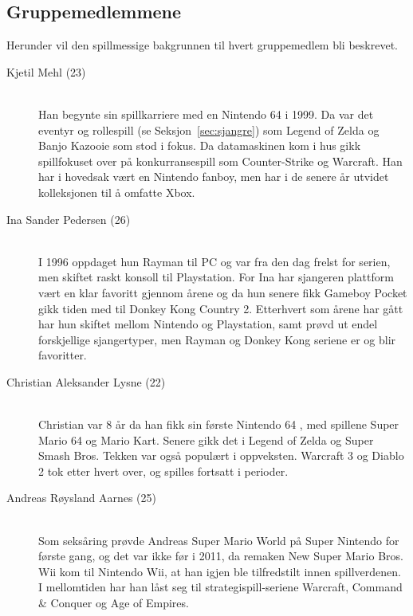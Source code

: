 \subsection{Gruppemedlemmene}
Herunder vil den spillmessige bakgrunnen til hvert gruppemedlem bli
beskrevet.
\begin{description}
\item[Kjetil Mehl (23)] \hfill \\
Han begynte sin spillkarriere med en Nintendo 64\cite{n64} i 1999. Da
var det eventyr og rollespill (se Seksjon~\ref{sec:sjangre}) som Legend
of Zelda\cite{legendofzelda} og Banjo Kazooie\cite{banjokazooie} som
stod i fokus. Da datamaskinen kom i hus gikk spillfokuset  over på
konkurransespill som Counter-Strike og Warcraft. Han har i hovedsak vært
en Nintendo fanboy\cite{fanboy}, men har i de senere år utvidet
kolleksjonen til å omfatte Xbox.
\item[Ina Sander Pedersen (26)] \hfill \\
I 1996 oppdaget hun Rayman\cite{rayman} til PC og var fra den dag frelst for serien, men skiftet raskt konsoll til Playstation. For Ina har sjangeren plattform vært en klar favoritt gjennom årene og da hun senere fikk Gameboy Pocket\cite{gameboy} gikk tiden med til Donkey Kong Country 2\cite{DKC2}. Etterhvert som årene har gått har hun skiftet mellom Nintendo og Playstation, samt prøvd ut endel forskjellige sjangertyper, men Rayman og Donkey Kong seriene er og blir favoritter. 
\item[Christian Aleksander Lysne (22)] \hfill \\
Christian var 8 år da han fikk sin første Nintendo 64\cite{n64} , med spillene Super Mario 64\cite{mario64} og Mario Kart\cite{mariokart}. Senere gikk det i Legend of Zelda\cite{legendofzelda} og Super Smash Bros\cite{smash}. Tekken\cite{tekken} var også  populært i oppveksten. Warcraft 3\cite{wc3} og Diablo 2\cite{diablo2} tok etter hvert over, og spilles fortsatt i perioder.
\item[Andreas Røysland Aarnes (25)] \hfill \\
Som seksåring prøvde Andreas Super Mario World\cite{supermarioworld} på Super Nintendo\cite{supernintendo} for første gang, og det var ikke før i 2011, da remaken New Super Mario Bros. Wii\cite{newsupermario} kom til Nintendo Wii\cite{wii}, at han igjen ble tilfredstilt innen spillverdenen. I mellomtiden har han låst seg til strategispill-seriene Warcraft\cite{wc3}, Command \& Conquer\cite{cc} og Age of Empires\cite{aoe}. 
\end{description}
